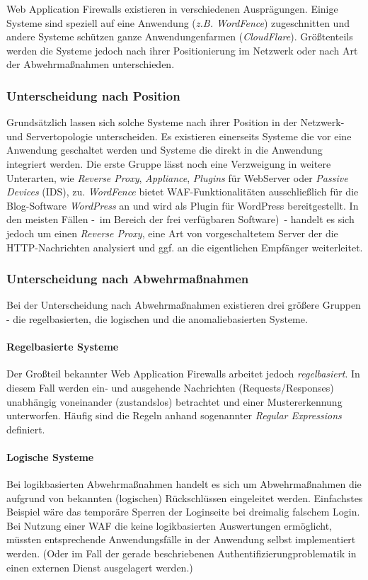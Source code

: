 Web Application Firewalls existieren in verschiedenen Ausprägungen. Einige Systeme sind speziell auf eine Anwendung (\emph{z.B. WordFence}) zugeschnitten und andere Systeme schützen ganze Anwendungenfarmen (\emph{CloudFlare}). Größtenteils werden die Systeme jedoch nach ihrer Positionierung im Netzwerk oder nach Art der Abwehrmaßnahmen unterschieden.

\subsubsection{Unterscheidung nach Position}
Grundsätzlich lassen sich solche Systeme nach ihrer Position in der Netzwerk- und Servertopologie unterscheiden. Es existieren einerseits Systeme die vor eine Anwendung geschaltet werden und Systeme die direkt in die Anwendung integriert werden. Die erste Gruppe lässt noch eine Verzweigung in weitere Unterarten, wie \emph{Reverse Proxy}, \emph{Appliance}, \emph{Plugins} für WebServer oder \emph{Passive Devices} (IDS), zu. \emph{WordFence} bietet WAF-Funktionalitäten ausschließlich für die Blog-Software \emph{WordPress} an und wird als Plugin für WordPress bereitgestellt. In den meisten Fällen -~im Bereich der frei verfügbaren Software)~- handelt es sich jedoch um einen \emph{Reverse Proxy}, eine Art von vorgeschaltetem Server der die HTTP-Nachrichten analysiert und ggf. an die eigentlichen Empfänger weiterleitet.


\subsubsection{Unterscheidung nach Abwehrmaßnahmen}

Bei der Unterscheidung nach Abwehrmaßnahmen existieren drei größere Gruppen - die regelbasierten, die logischen und die anomaliebasierten Systeme. 

\paragraph{Regelbasierte Systeme}
Der Großteil bekannter Web Application Firewalls arbeitet jedoch \emph{regelbasiert}. In diesem Fall werden ein- und ausgehende Nachrichten (Requests/Responses) unabhängig voneinander (zustandslos) betrachtet und einer Mustererkennung unterworfen. Häufig sind die Regeln anhand sogenannter \emph{Regular Expressions} definiert.

\paragraph{Logische Systeme}
Bei logikbasierten Abwehrmaßnahmen handelt es sich um Abwehrmaßnahmen die aufgrund von bekannten (logischen) Rückschlüssen eingeleitet werden. Einfachstes Beispiel wäre das temporäre Sperren der Loginseite bei dreimalig falschem Login. Bei Nutzung einer WAF die keine logikbasierten Auswertungen ermöglicht, müssten entsprechende Anwendungsfälle in der Anwendung selbst implementiert werden. (Oder im Fall der gerade beschriebenen Authentifizierungproblematik in einen externen Dienst ausgelagert werden.)


